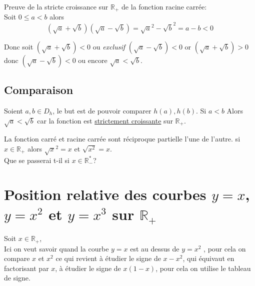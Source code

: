 \documentclass[french]{book}
\begin{document}
\begin{demo}

Preuve de la stricte croissance sur $\mathbb{R}_+$ de la fonction racine carrée:\\

Soit $0\leq a<b$ alors $$(\sqrt{a}+\sqrt{b})(\sqrt{a}-\sqrt{b})=\sqrt{a}^2 -\sqrt{b}^2=a-b <0$$

Donc soit $(\sqrt{a}+\sqrt{b})<0$ ou \emph{exclusif} $(\sqrt{a}-\sqrt{b})<0$  or  $(\sqrt{a}+\sqrt{b})>0$ donc $(\sqrt{a}-\sqrt{b})<0$ ou encore $\sqrt{a}<\sqrt{b}$.

\end{demo}



\subsection*{Comparaison}
Soient $a,b \in D_h$, le but est de pouvoir comparer $h(a),h(b)$.
Si $a<b$ Alors $\sqrt{a}<\sqrt{b}$ car la fonction est \underline{strictement croissante} sur $\mathbb{R}_+$.


\begin{prop}
La fonction carré et racine carrée sont réciproque partielle l'une de l'autre. si $x \in \mathbb{R}_+$ alors $\sqrt{x}^2=x$ et $\sqrt{x^2}=x$.\\
 
Que se passerai t-il si $x \in \mathbb{R}_-^*$?
\end{prop}


\section{Position relative des courbes $y=x$, $y=x^2$ et $y=x^3$ sur $\mathbb{R}_+$}

Soit $x \in \mathbb{R}_+$,\\

Ici on veut savoir quand la courbe $y=x$ est au dessus de $y=x^2$ , pour cela on compare $x$ et $x^2$ ce qui revient à étudier le signe de $x-x^2$, qui équivaut en factorisant par $x$, à étudier le signe de $x(1-x)$, pour cela on utilise le tableau de signe.


\begin{center}
\end{center}
\end{document}

